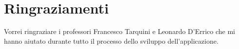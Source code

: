 \chapter*{Ringraziamenti}
Vorrei ringraziare i professori Francesco Tarquini e Leonardo D'Errico che mi hanno aiutato durante tutto il processo dello sviluppo dell'applicazione.